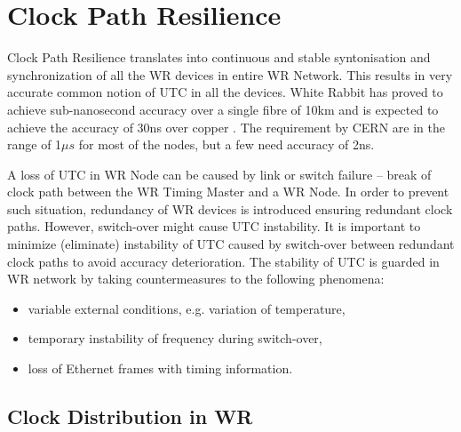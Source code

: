 \chapter{Clock Path Resilience} 

Clock Path Resilience translates into continuous and stable syntonisation and
synchronization of all the WR devices in entire WR Network. This results in very
accurate common notion of UTC in all the devices. White Rabbit has proved to
achieve sub-nanosecond accuracy over a single fibre of 10km and is expected to
achieve the accuracy of 30ns over copper \cite{TomekMSc}. The requirement by
CERN are in the range of 1$\mu s$ for most of the nodes, but a few need
accuracy of 2ns. 

A loss of UTC in WR Node can be caused by link or switch failure -- break of
clock path between the WR Timing Master and a WR Node. In order to prevent
such situation, redundancy of WR devices is introduced ensuring redundant clock
paths. However, switch-over might cause UTC instability. It is
important to minimize (eliminate) instability of UTC caused by switch-over
between redundant clock paths to avoid accuracy deterioration. The stability of
UTC is guarded in WR network by taking countermeasures to the following
phenomena:
\begin{itemize}
  \item variable external conditions, e.g. variation of temperature,
  \item temporary instability of frequency during switch-over,
  \item loss of Ethernet frames with timing information.
\end{itemize}
  
\section{Clock Distribution in WR}

